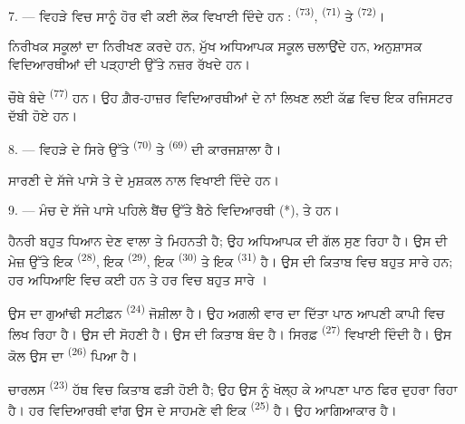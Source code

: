 7. --- ਵਿਹੜੇ ਵਿਚ ਸਾਨੂੰ ਹੋਰ ਵੀ ਕਈ ਲੋਕ ਵਿਖਾਈ ਦਿੰਦੇ ਹਨ : 
\textsuperscript{(73)},  \textsuperscript{(71)} ਤੇ
 \textsuperscript{(72)}।

ਨਿਰੀਖਕ ਸਕੂਲਾਂ ਦਾ ਨਿਰੀਖਣ ਕਰਦੇ ਹਨ, ਮੁੱਖ ਅਧਿਆਪਕ ਸਕੂਲ ਚਲਾਉਂਦੇ ਹਨ, ਅਨੁਸ਼ਾਸਕ
ਵਿਦਿਆਰਥੀਆਂ ਦੀ ਪੜ੍ਹਾਈ ਉੱਤੇ ਨਜ਼ਰ ਰੱਖਦੇ ਹਨ।

ਚੌਥੇ ਬੰਦੇ  \textsuperscript{(77)} ਹਨ। ਉਹ ਗ਼ੈਰ-ਹਾਜ਼ਰ ਵਿਦਿਆਰਥੀਆਂ
ਦੇ ਨਾਂ ਲਿਖਣ ਲਈ ਕੱਛ ਵਿਚ ਇਕ ਰਜਿਸਟਰ ਦੱਬੀ ਹੋਏ ਹਨ।

8. --- ਵਿਹੜੇ ਦੇ ਸਿਰੇ ਉੱਤੇ  \textsuperscript{(70)} ਤੇ
 \textsuperscript{(69)} ਦੀ ਕਾਰਜਸ਼ਾਲਾ ਹੈ।

ਸਾਰਣੀ ਦੇ ਸੱਜੇ ਪਾਸੇ  ਤੇ  ਦੇ 
ਮੁਸ਼ਕਲ ਨਾਲ ਵਿਖਾਈ ਦਿੰਦੇ ਹਨ।


\VUsaut{2.4mm}

\VUsaut{3.0mm}

9. --- ਮੰਚ ਦੇ ਸੱਜੇ ਪਾਸੇ ਪਹਿਲੇ ਬੈਂਚ ਉੱਤੇ ਬੈਠੇ ਵਿਦਿਆਰਥੀ  (*),
 ਤੇ  ਹਨ।

ਹੈਨਰੀ ਬਹੁਤ ਧਿਆਨ ਦੇਣ ਵਾਲਾ ਤੇ ਮਿਹਨਤੀ ਹੈ; ਉਹ ਅਧਿਆਪਕ ਦੀ ਗੱਲ ਸੁਣ ਰਿਹਾ ਹੈ। ਉਸ ਦੀ
ਮੇਜ਼ ਉੱਤੇ ਇਕ  \textsuperscript{(28)}, ਇਕ 
\textsuperscript{(29)}, ਇਕ  \textsuperscript{(30)} ਤੇ ਇਕ
 \textsuperscript{(31)} ਹੈ। ਉਸ ਦੀ ਕਿਤਾਬ ਵਿਚ ਬਹੁਤ ਸਾਰੇ
 ਹਨ; ਹਰ ਅਧਿਆਇ ਵਿਚ ਕਈ  ਹਨ ਤੇ ਹਰ  ਵਿਚ ਬਹੁਤ
ਸਾਰੇ ।

ਉਸ ਦਾ ਗੁਆਂਢੀ ਸਟੀਫ਼ਨ \textsuperscript{(24)} ਜੋਸ਼ੀਲਾ ਹੈ। ਉਹ ਅਗਲੀ ਵਾਰ ਦਾ ਦਿੱਤਾ ਪਾਠ
ਆਪਣੀ ਕਾਪੀ ਵਿਚ ਲਿਖ ਰਿਹਾ ਹੈ। ਉਸ ਦੀ  ਸੋਹਣੀ ਹੈ। ਉਸ ਦੀ ਕਿਤਾਬ ਬੰਦ
ਹੈ। ਸਿਰਫ਼  \textsuperscript{(27)} ਵਿਖਾਈ ਦਿੰਦੀ ਹੈ। ਉਸ ਕੋਲ ਉਸ ਦਾ
 \textsuperscript{(26)} ਪਿਆ ਹੈ।

ਚਾਰਲਸ \textsuperscript{(23)} ਹੱਥ ਵਿਚ ਕਿਤਾਬ ਫੜੀ ਹੋਈ ਹੈ; ਉਹ ਉਸ ਨੂੰ ਖੋਲ੍ਹ ਕੇ ਆਪਣਾ
ਪਾਠ ਫਿਰ ਦੁਹਰਾ ਰਿਹਾ ਹੈ। ਹਰ ਵਿਦਿਆਰਥੀ ਵਾਂਗ ਉਸ ਦੇ ਸਾਹਮਣੇ ਵੀ ਇਕ 
\textsuperscript{(25)} ਹੈ। ਉਹ ਆਗਿਆਕਾਰ ਹੈ।

